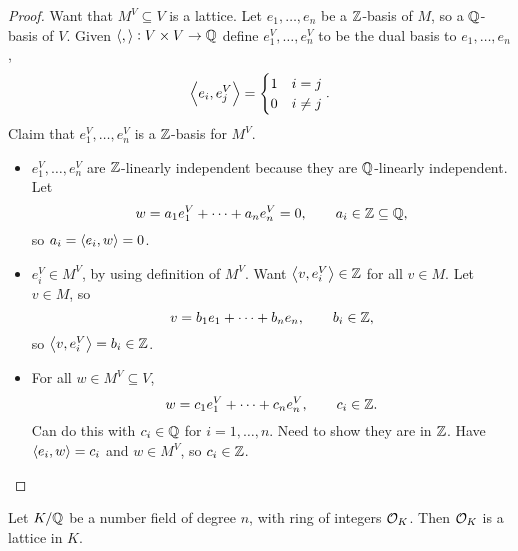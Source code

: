 \begin{proof}
Want that $ M^V \subseteq V $ is a lattice. Let $ e_1, \dots, e_n $ be a $ \mathbb{Z} $-basis of $ M $, so a $ \mathbb{Q} $-basis of $ V $. Given $ \left\langle , \right\rangle : V \times V \to \mathbb{Q} $ define $ e_1^V, \dots, e_n^V $ to be the dual basis to $ e_1, \dots, e_n $,
$$ \left\langle e_i, e_j^V \right\rangle =
\begin{cases}
1 & i = j \\
0 & i \ne j
\end{cases}.
$$
Claim that $ e_1^V, \dots, e_n^V $ is a $ \mathbb{Z} $-basis for $ M^V $.
\begin{itemize}
\item $ e_1^V, \dots, e_n^V $ are $ \mathbb{Z} $-linearly independent because they are $ \mathbb{Q} $-linearly independent. Let
$$ w = a_1e_1^V + \dots + a_ne_n^V = 0, \qquad a_i \in \mathbb{Z} \subseteq \mathbb{Q}, $$
so $ a_i = \left\langle e_i, w \right\rangle = 0 $.
\item $ e_i^V \in M^V $, by using definition of $ M^V $. Want $ \left\langle v, e_i^V \right\rangle \in \mathbb{Z} $ for all $ v \in M $. Let $ v \in M $, so
$$ v = b_1e_1 + \dots + b_ne_n, \qquad b_i \in \mathbb{Z}, $$
so $ \left\langle v, e_i^V \right\rangle = b_i \in \mathbb{Z} $.
\item For all $ w \in M^V \subseteq V $,
$$ w = c_1e_1^V + \dots + c_ne_n^V, \qquad c_i \in \mathbb{Z}. $$
Can do this with $ c_i \in \mathbb{Q} $ for $ i = 1, \dots, n $. Need to show they are in $ \mathbb{Z} $. Have $ \left\langle e_i, w \right\rangle = c_i $ and $ w \in M^V $, so $ c_i \in \mathbb{Z} $.
\end{itemize}
\end{proof}

\begin{theorem}
Let $ K / \mathbb{Q} $ be a number field of degree $ n $, with ring of integers $ \mathcal{O}_K $. Then $ \mathcal{O}_K $ is a lattice in $ K $.
\end{theorem}

